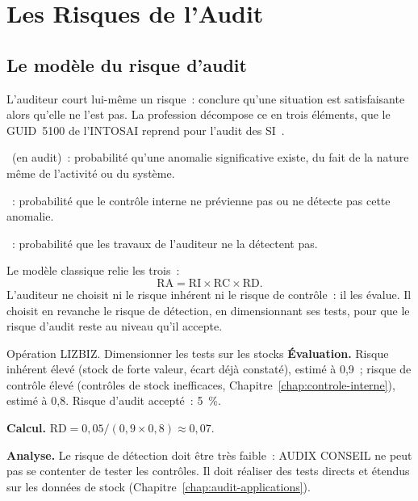 \section{Les Risques de l'Audit}
\label{sec:c03-audit}

\subsection{Le modèle du risque d'audit}

L'auditeur court lui-même un risque~: conclure qu'une situation est
satisfaisante alors qu'elle ne l'est pas. La profession décompose ce
 en trois éléments, que le
GUID~5100 de l'INTOSAI reprend pour l'audit des SI~\cite{intosai2019guid5100}.

\begin{boxdef}
~(en audit)~: probabilité qu'une anomalie
significative existe, du fait de la nature même de l'activité ou du système.

\medskip
{}~: probabilité que le
contrôle interne ne prévienne pas ou ne détecte pas cette anomalie.

\medskip
{}~: probabilité que
les travaux de l'auditeur ne la détectent pas.
\end{boxdef}

Le modèle classique relie les trois~:
\[
    \text{RA} = \text{RI} \times \text{RC} \times \text{RD}.
\]
L'auditeur ne choisit ni le risque inhérent ni le risque de contrôle~: il
les évalue. Il choisit en revanche le risque de détection, en dimensionnant
ses tests, pour que le risque d'audit reste au niveau qu'il accepte.

\begin{boxscenario}{Opération LIZBIZ. Dimensionner les tests sur les stocks}
\textbf{Évaluation.} Risque inhérent élevé (stock de forte valeur, écart
déjà constaté), estimé à 0,9~; risque de contrôle élevé (contrôles de stock
inefficaces, Chapitre~\ref{chap:controle-interne}), estimé à 0,8. Risque
d'audit accepté~: 5~\%.

\medskip
\textbf{Calcul.} $\text{RD} = 0{,}05 / (0{,}9 \times 0{,}8) \approx 0{,}07$.

\medskip
\textbf{Analyse.} Le risque de détection doit être très faible~: AUDIX
CONSEIL ne peut pas se contenter de tester les contrôles. Il doit réaliser
des tests directs et étendus sur les données de stock
(Chapitre~\ref{chap:audit-applications}).
\end{boxscenario}

